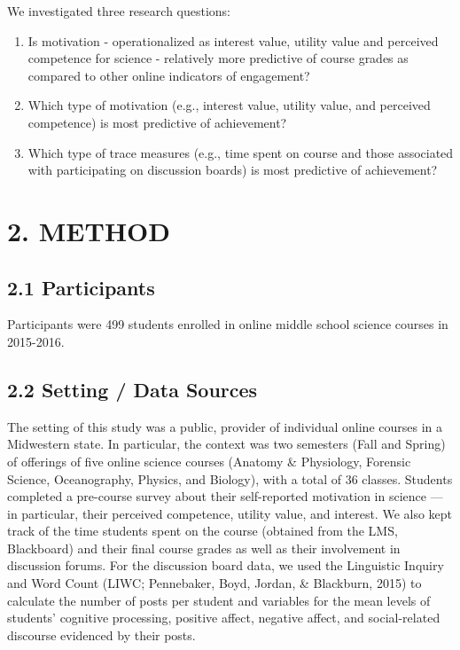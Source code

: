 \documentclass[acmart]{apa6}
\providecommand{\tightlist}{%
  \setlength{\itemsep}{0pt}\setlength{\parskip}{0pt}}
\theoremstyle{definition}
\theoremstyle{definition}
\theoremstyle{definition}
\theoremstyle{remark}
\begin{document}
We investigated three research questions:

\begin{enumerate}
\def\labelenumi{\arabic{enumi}.}
\tightlist
\item
  Is motivation - operationalized as interest value, utility value and
  perceived competence for science - relatively more predictive of
  course grades as compared to other online indicators of engagement?
\item
  Which type of motivation (e.g., interest value, utility value, and
  perceived competence) is most predictive of achievement?
\item
  Which type of trace measures (e.g., time spent on course and those
  associated with participating on discussion boards) is most predictive
  of achievement?
\end{enumerate}

\section{2. METHOD}\label{method}

\subsection{2.1 Participants}\label{participants}

Participants were 499 students enrolled in online middle school science
courses in 2015-2016.

\subsection{2.2 Setting / Data Sources}\label{setting-data-sources}

The setting of this study was a public, provider of individual online
courses in a Midwestern state. In particular, the context was two
semesters (Fall and Spring) of offerings of five online science courses
(Anatomy \& Physiology, Forensic Science, Oceanography, Physics, and
Biology), with a total of 36 classes. Students completed a pre-course
survey about their self-reported motivation in science --- in
particular, their perceived competence, utility value, and interest. We
also kept track of the time students spent on the course (obtained from
the LMS, Blackboard) and their final course grades as well as their
involvement in discussion forums. For the discussion board data, we used
the Linguistic Inquiry and Word Count (LIWC; Pennebaker, Boyd, Jordan,
\& Blackburn, 2015) to calculate the number of posts per student and
variables for the mean levels of students' cognitive processing,
positive affect, negative affect, and social-related discourse evidenced
by their posts.
\end{document}
